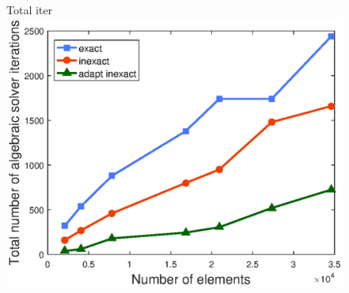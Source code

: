 \documentclass[10 pt]{beamer}
\begin{document}
\begin{frame}
\begin{figure}[H]
\begin{minipage}[c]{.42\linewidth}
\end{minipage} \hfill
\end{figure}
\begin{figure}
\vspace*{-0.04\textwidth} \hspace*{0.25\textwidth}
\begin{minipage}{.47\linewidth} 
\centering   Total iter
 \includegraphics[width=\textwidth]{fig_article/number_total_iter_three_methods_with_number_elements.eps}     
\end{minipage} \hfill
\label{ref:figure:plot:number:alg:iter:per:newton:step}
\end{figure}


\end{frame}
\end{document}
